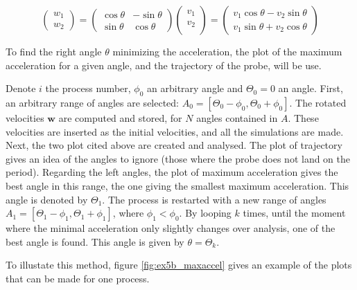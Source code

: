 \documentclass[a4paper,12pt,twoside]{article}
\begin{document}
\begin{equation}
  \begin{pmatrix}
    w_1 \\
    w_2
  \end{pmatrix}
  =
  \begin{pmatrix}
    \cos\theta & -\sin\theta \\
    \sin\theta & \cos\theta
  \end{pmatrix}
  \begin{pmatrix}
    v_1 \\
    v_2 \\
  \end{pmatrix}
  =
  \begin{pmatrix}
    v_1\cos\theta - v_2\sin\theta \\
    v_1\sin\theta + v_2\cos\theta
  \end{pmatrix}
  \label{eq:v_rotation}
\end{equation}

To find the right angle $\theta$ minimizing the acceleration, the plot of the maximum acceleration for a given angle, and the trajectory of the probe, will be use.

Denote $i$ the process number, $\phi_0$ an arbitrary angle and $\Theta_0 = 0$ an angle.
First, an arbitrary range of angles are selected: $A_0 = [\Theta_0-\phi_0, \Theta_0+\phi_0]$.
The rotated velocities $\mathbf{w}$ are computed and stored, for $N$ angles contained in $A$.
These velocities are inserted as the initial velocities, and all the simulations are made.
Next, the two plot cited above are created and analysed.
The plot of trajectory gives an idea of the angles to ignore (those where the probe does not land on the period).
Regarding the left angles, the plot of maximum acceleration gives the best angle in this range, the one giving the smallest maximum acceleration. This angle is denoted by $\Theta_1$.
The process is restarted with a new range of angles $A_1 = [\Theta_1 - \phi_1, \Theta_1 + \phi_1]$, where $\phi_1 < \phi_0$.
By looping $k$ times, until the moment where the minimal acceleration only slightly changes over analysis,  one of the best angle is found.
This angle is given by $\theta = \Theta_k$.

To illustate this method, figure \ref{fig:ex5b_maxaccel} gives an example of the plots that can be made for one process.
\end{document}
